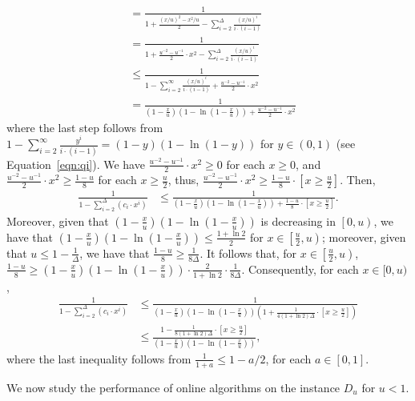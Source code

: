 \documentclass[11pt]{article}
\begin{document}
\begin{appendixproof}
\begin{align*}
     &=\frac1{1+\frac{(x/u)^2 -x^2/u}2-\sum_{i=2}^{\Delta} \frac{(x/u)^i}{i \cdot (i-1)}}\\
     &=\frac1{1+\frac{u^{-2} - u^{-1}}2 \cdot x^2-\sum_{i=2}^{\Delta} \frac{(x/u)^i}{i \cdot (i-1)}}\\
     &\le\frac1{1-\sum_{i=2}^{\infty} \frac{(x/u)^i}{i \cdot (i-1)}+\frac{u^{-2} - u^{-1}}2 \cdot x^2}\\
     &=\frac1{\left(1-\frac xu\right)\left(1-\ln\left(1-\frac xu\right)\right)+\frac{u^{-2} - u^{-1}}2 \cdot x^2}
\end{align*}
where the last step follows from $1 - \sum_{i=2}^{\infty} \frac{y^i}{i\cdot(i-1)} = (1-y) (1-\ln(1-y))$ for $y\in(0,1)$ (see Equation~\ref{eqn:qi}). We have $\frac{u^{-2} - u^{-1}}{2} \cdot x^2 \ge 0$ for each $x \ge 0$, and $\frac{u^{-2} - u^{-1}}{2} \cdot x^2 \ge \frac{1-u}{8}$ for each $x \ge \frac{u}{2}$, thus, $\frac{u^{-2} - u^{-1}}{2} \cdot x^2 \ge \frac{1-u}{8} \cdot \left[x \ge \frac{u}{2}\right]$.  Then,
\begin{align*}
    \frac1{1- \sum_{i=2}^\Delta \left(c_i \cdot x^i\right)}
    &\le\frac1{\left(1-\frac xu\right)\left(1-\ln\left(1-\frac xu\right)\right)+\frac{1-u}{8} \cdot \left[x \ge \frac{u}{2}\right]}.
\end{align*}
Moreover, given that $\left(1- \frac xu\right)\left(1-\ln\left(1-\frac xu\right)\right)$ is decreasing in $\left[0,u\right)$, we have that $\left(1-\frac xu\right)\left(1-\ln\left(1-\frac xu\right)\right) \le \frac{1 + \ln 2}2$ for $x \in \left[\frac u2, u\right)$; moreover, given that $u \le 1-\frac1{\Delta}$, we have that $\frac{1-u}8 \ge \frac1{8 \Delta}$. It follows that, for $x \in \left[\frac u2,u\right)$, $\frac{1-u}8 \ge  \left(1-\frac xu\right)\left(1-\ln\left(1-\frac  xu\right)\right) \cdot \frac2{1+\ln 2} \cdot \frac1{8\Delta}$. Consequently, for each $x \in [0,u)$,
\begin{align*}
    \frac1{1- \sum_{i=2}^\Delta \left(c_i \cdot x^i\right)}
    &\le \frac{1}{\left(1-\frac xu\right)\left(1-\ln\left(1-\frac xu\right)\right)\left(1+ \frac{1}{4(1+\ln 2)\Delta} \cdot \left[x \ge \frac{u}{2}\right]\right)}\\
    &\le\frac{1-\frac1{8(1+\ln 2)\Delta} \cdot \left[x \ge \frac{u}{2}\right]}{\left(1-\frac xu\right)\left(1-\ln\left(1-\frac xu\right)\right)},
\end{align*}
where the last inequality follows from $\frac1{1+a} \le 1-a/2$, for each $a \in [0,1]$.
\end{appendixproof}
We now study the performance of  online algorithms on the instance $D_u$ for $u<1$.
\end{document}
